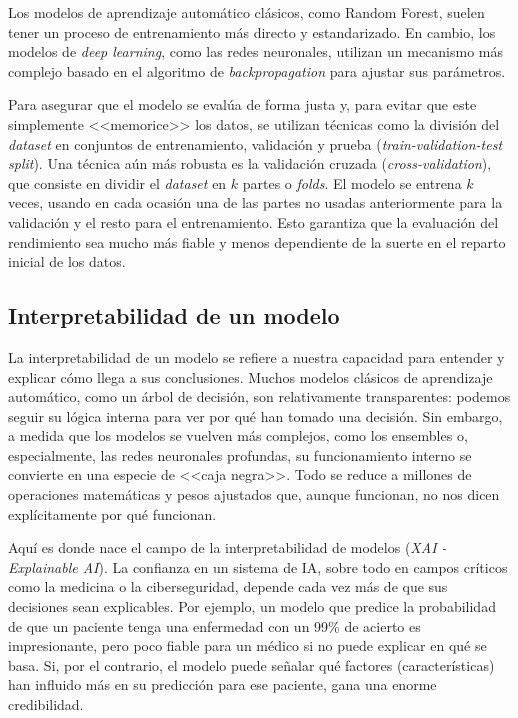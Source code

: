 Los modelos de aprendizaje automático clásicos, como Random Forest, suelen tener un proceso de entrenamiento más directo y estandarizado. En cambio, los modelos de \textit{deep learning}, como las redes neuronales, utilizan un mecanismo más complejo basado en el algoritmo de \textit{backpropagation} para ajustar sus parámetros.

Para asegurar que el modelo se evalúa de forma justa y, para evitar que este simplemente <<memorice>> los datos, se utilizan técnicas como la división del \textit{dataset} en conjuntos de entrenamiento, validación y prueba (\textit{train-validation-test split}). Una técnica aún más robusta es la validación cruzada (\textit{cross-validation}), que consiste en dividir el \textit{dataset} en $k$ partes o \textit{folds}. El modelo se entrena $k$ veces, usando en cada ocasión una de las partes no usadas anteriormente para la validación y el resto para el entrenamiento. Esto garantiza que la evaluación del rendimiento sea mucho más fiable y menos dependiente de la suerte en el reparto inicial de los datos.

\subsection{Interpretabilidad de un modelo}

La interpretabilidad de un modelo se refiere a nuestra capacidad para entender y explicar cómo llega a sus conclusiones. Muchos modelos clásicos de aprendizaje automático, como un árbol de decisión, son relativamente transparentes: podemos seguir su lógica interna para ver por qué han tomado una decisión. Sin embargo, a medida que los modelos se vuelven más complejos, como los ensembles o, especialmente, las redes neuronales profundas, su funcionamiento interno se convierte en una especie de <<caja negra>>. Todo se reduce a millones de operaciones matemáticas y pesos ajustados que, aunque funcionan, no nos dicen explícitamente por qué funcionan.

Aquí es donde nace el campo de la interpretabilidad de modelos (\textit{XAI - Explainable AI}). La confianza en un sistema de IA, sobre todo en campos críticos como la medicina o la ciberseguridad, depende cada vez más de que sus decisiones sean explicables. Por ejemplo, un modelo que predice la probabilidad de que un paciente tenga una enfermedad con un 99\% de acierto es impresionante, pero poco fiable para un médico si no puede explicar en qué se basa. Si, por el contrario, el modelo puede señalar qué factores (características) han influido más en su predicción para ese paciente, gana una enorme credibilidad.

